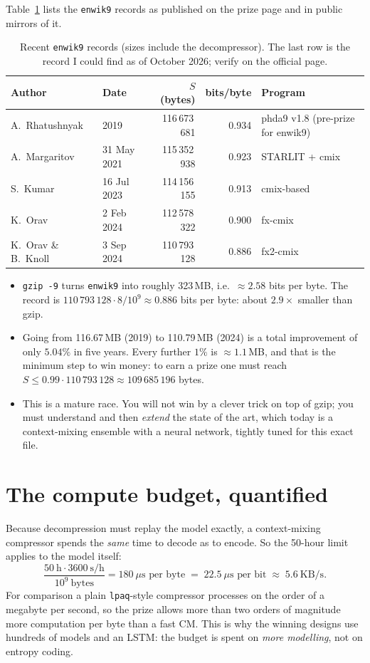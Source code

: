 \documentclass[11pt,a4paper,openany]{book}
\newcommand{\code}[1]{\texttt{#1}}
\theoremstyle{definition}
\theoremstyle{remark}
\begin{document}
Table~\ref{tab:records} lists the \code{enwik9} records as published on the prize page and in public mirrors of it.

\begin{table}[h]
\centering
\small
\begin{tabular}{@{}llrrp{3.6cm}@{}}
\toprule
Author & Date & $S$ (bytes) & bits/byte & Program\\
\midrule
A.~Rhatushnyak & 2019 & 116\,673\,681 & 0.934 & phda9 v1.8 (pre-prize for enwik9)\\
A.~Margaritov & 31 May 2021 & 115\,352\,938 & 0.923 & STARLIT + cmix\\
S.~Kumar & 16 Jul 2023 & 114\,156\,155 & 0.913 & cmix-based\\
K.~Orav & 2 Feb 2024 & 112\,578\,322 & 0.900 & fx-cmix\\
K.~Orav \& B.~Knoll & 3 Sep 2024 & 110\,793\,128 & 0.886 & fx2-cmix\\
\bottomrule
\end{tabular}
\caption{Recent \code{enwik9} records (sizes include the decompressor). The last row is the record I could find as of October 2026; verify on the official page.}
\label{tab:records}
\end{table}

\begin{itemize}
\item \code{gzip -9} turns \code{enwik9} into roughly 323\,MB, i.e.\ $\approx 2.58$ bits per byte. The record is $110\,793\,128\cdot 8/10^9\approx 0.886$ bits per byte: about $2.9\times$ smaller than gzip.
\item Going from 116.67\,MB (2019) to 110.79\,MB (2024) is a total improvement of only $5.04\%$ in five years. Every further $1\%$ is $\approx 1.1$\,MB, and that is the minimum step to win money: to earn a prize one must reach $S\le 0.99\cdot 110\,793\,128\approx 109\,685\,196$ bytes.
\item This is a mature race. You will not win by a clever trick on top of gzip; you must understand and then \emph{extend} the state of the art, which today is a context-mixing ensemble with a neural network, tightly tuned for this exact file.
\end{itemize}

\section{The compute budget, quantified}

Because decompression must replay the model exactly, a context-mixing compressor spends the \emph{same} time to decode as to encode. So the 50-hour limit applies to the model itself:
\[
\frac{50\ \text{h}\cdot 3600\ \text{s/h}}{10^9\ \text{bytes}} = 180\ \mu\text{s per byte}\;=\;22.5\ \mu\text{s per bit}\;\approx\;5.6\ \text{KB/s}.
\]
For comparison a plain \code{lpaq}-style compressor processes on the order of a megabyte per second, so the prize allows more than two orders of magnitude more computation per byte than a fast CM. This is why the winning designs use hundreds of models and an LSTM: the budget is spent on \emph{more modelling}, not on entropy coding.
\end{document}

